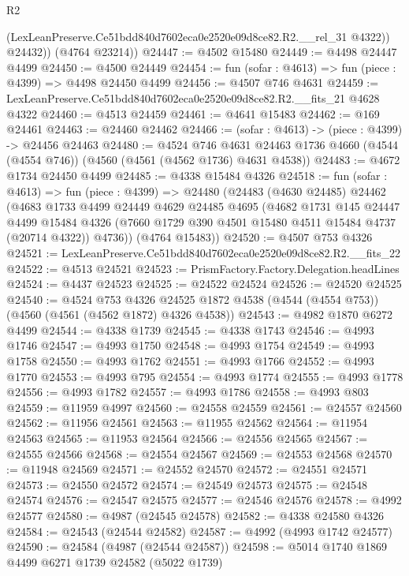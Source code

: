 \begin{lexlean}{R2}
\begin{coremodule}
            (LexLeanPreserve.Ce51bdd840d7602eca0e2520e09d8ce82.R2.__rel_31 @4322))
          @24432))
      (@4764 @23214))
@24447 := @4502 @15480
@24449 := @4498 @24447 @4499
@24450 := @4500 @24449
@24454 := fun (sofar : @4613) => fun (piece : @4399) => @4498 @24450 @4499
@24456 := @4507 @746 @4631
@24459 := LexLeanPreserve.Ce51bdd840d7602eca0e2520e09d8ce82.R2.__fits_21 @4628 @4322
@24460 := @4513 @24459
@24461 := @4641 @15483
@24462 := @169 @24461
@24463 := @24460 @24462
@24466 := (sofar : @4613) -> (piece : @4399) -> @24456 @24463
@24480 := @4524
    @746
    @4631
    @24463
    @1736
    @4660
    (@4544 (@4554 @746))
    (@4560 (@4561 (@4562 @1736) @4631 @4538))
@24483 := @4672 @1734 @24450 @4499
@24485 := @4338 @15484 @4326
@24518 := fun (sofar : @4613) =>
  fun (piece : @4399) =>
  @24480
    (@24483
      (@4630 @24485)
      @24462
      (@4683
        @1733
        @4499
        @24449
        @4629
        @24485
        @4695
        (@4682
          @1731
          @145
          @24447
          @4499
          @15484
          @4326
          (@7660 @1729 @390 @4501 @15480 @4511 @15484 @4737 (@20714 @4322))
          @4736))
      (@4764 @15483))
@24520 := @4507 @753 @4326
@24521 := LexLeanPreserve.Ce51bdd840d7602eca0e2520e09d8ce82.R2.__fits_22
@24522 := @4513 @24521
@24523 := PrismFactory.Factory.Delegation.headLines
@24524 := @4437 @24523
@24525 := @24522 @24524
@24526 := @24520 @24525
@24540 := @4524
    @753
    @4326
    @24525
    @1872
    @4538
    (@4544 (@4554 @753))
    (@4560 (@4561 (@4562 @1872) @4326 @4538))
@24543 := @4982 @1870 @6272 @4499
@24544 := @4338 @1739
@24545 := @4338 @1743
@24546 := @4993 @1746
@24547 := @4993 @1750
@24548 := @4993 @1754
@24549 := @4993 @1758
@24550 := @4993 @1762
@24551 := @4993 @1766
@24552 := @4993 @1770
@24553 := @4993 @795
@24554 := @4993 @1774
@24555 := @4993 @1778
@24556 := @4993 @1782
@24557 := @4993 @1786
@24558 := @4993 @803
@24559 := @11959 @4997
@24560 := @24558 @24559
@24561 := @24557 @24560
@24562 := @11956 @24561
@24563 := @11955 @24562
@24564 := @11954 @24563
@24565 := @11953 @24564
@24566 := @24556 @24565
@24567 := @24555 @24566
@24568 := @24554 @24567
@24569 := @24553 @24568
@24570 := @11948 @24569
@24571 := @24552 @24570
@24572 := @24551 @24571
@24573 := @24550 @24572
@24574 := @24549 @24573
@24575 := @24548 @24574
@24576 := @24547 @24575
@24577 := @24546 @24576
@24578 := @4992 @24577
@24580 := @4987 (@24545 @24578)
@24582 := @4338 @24580 @4326
@24584 := @24543 (@24544 @24582)
@24587 := @4992 (@4993 @1742 @24577)
@24590 := @24584 (@4987 (@24544 @24587))
@24598 := @5014 @1740 @1869 @4499 @6271 @1739 @24582 (@5022 @1739)

\end{coremodule}
\end{lexlean}
